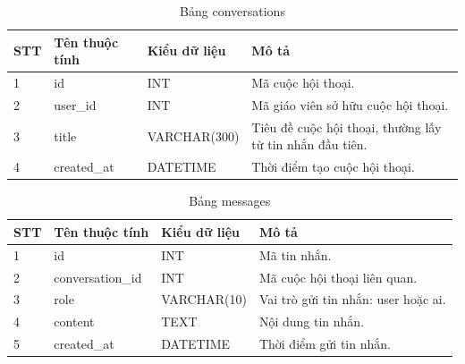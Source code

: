 \documentclass[12pt,a4paper]{article}
\begin{document}
	\begin{table}[H]
		\centering
		\caption{Bảng conversations}
		\label{tab:conversations}
		\begin{tabular}{|p{1.5cm}|p{4cm}|p{4cm}|p{5.5cm}|}
			\hline
			\centering\textbf{STT} & \centering\textbf{Tên thuộc tính} & \centering\textbf{Kiểu dữ liệu} & \centering\arraybackslash\textbf{Mô tả} \\
			\hline
			1 & id & INT & Mã cuộc hội thoại. \\
			\hline
			2 & user\_id & INT & Mã giáo viên sở hữu cuộc hội thoại. \\
			\hline
			3 & title & VARCHAR(300) & Tiêu đề cuộc hội thoại, thường lấy từ tin nhắn đầu tiên. \\
			\hline
			4 & created\_at & DATETIME & Thời điểm tạo cuộc hội thoại. \\
			\hline
		\end{tabular}
	\end{table}
	
	\begin{table}[H]
		\centering
		\caption{Bảng messages}
		\label{tab:messages}
		\begin{tabular}{|p{1.5cm}|p{4cm}|p{4cm}|p{5.5cm}|}
			\hline
			\centering\textbf{STT} & \centering\textbf{Tên thuộc tính} & \centering\textbf{Kiểu dữ liệu} & \centering\arraybackslash\textbf{Mô tả} \\
			\hline
			1 & id & INT & Mã tin nhắn. \\
			\hline
			2 & conversation\_id & INT & Mã cuộc hội thoại liên quan. \\
			\hline
			3 & role & VARCHAR(10) & Vai trò gửi tin nhắn: user hoặc ai. \\
			\hline
			4 & content & TEXT & Nội dung tin nhắn. \\
			\hline
			5 & created\_at & DATETIME & Thời điểm gửi tin nhắn. \\
			\hline
		\end{tabular}
	\end{table}
	
\end{document}
